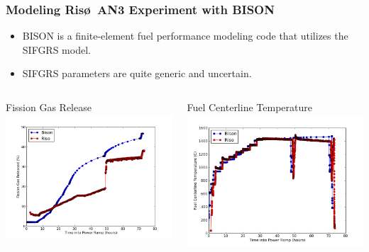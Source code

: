 \documentclass{beamer}
\begin{document}
\begin{frame}
\frametitle{Modeling Ris\o~AN3 Experiment with BISON}

\begin{itemize}
  \item BISON is a finite-element fuel performance modeling code that utilizes the SIFGRS model.
  \item SIFGRS parameters are quite generic and uncertain. 
\end{itemize}

\begin{columns}
 \begin{column}{0.5\textwidth}
  \centering
  Fission Gas Release
  \includegraphics[width=1.\textwidth]{./fgr_comparison.png}
 \end{column}
 \begin{column}{0.5\textwidth}
  \centering
  Fuel Centerline Temperature
  \includegraphics[width=1.\textwidth]{./tc_temp_comparison.png}
 \end{column}
\end{columns}

\end{frame}
\end{document}
